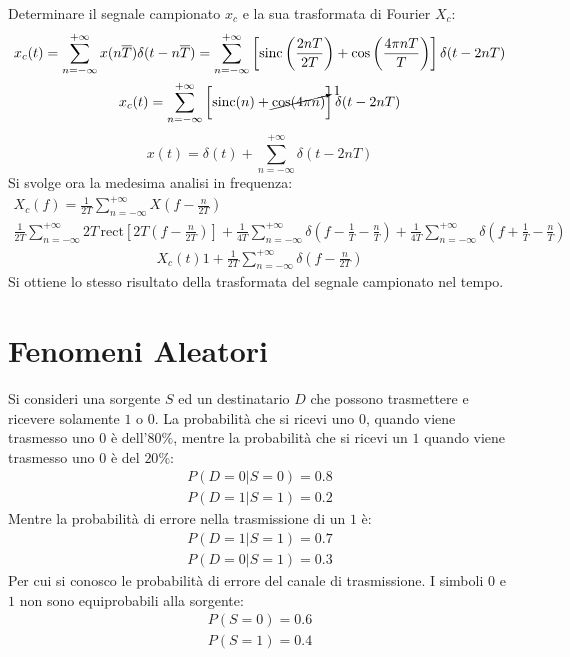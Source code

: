 \documentclass{article}
\newcommand{\rect}{\mathrm{rect}}
\newcommand{\sinc}{\mathrm{sinc}}
\begin{document}
Determinare il segnale campionato $x_c$ e la sua trasformata di Fourier $X_c$:
\begin{gather*}
    x_c(t)=\displaystyle\sum_{n=-\infty}^{+\infty}x(n\overline{T})\delta(t-n\overline{T})=\sum_{n=-\infty}^{+\infty}\left[\sinc\left(\frac{2nT}{2T}\right)+\cos\left(\frac{4\pi nT}{T}\right)\right]\delta(t-2nT)\\
    x_c(t)=\displaystyle\sum_{n=-\infty}^{+\infty}\left[\sinc(n)+\cancelto{1}{\cos(4\pi n)}\right]\delta(t-2nT)
\end{gather*}
\begin{equation}
    x(t)=\displaystyle\delta(t)+\sum_{n=-\infty}^{+\infty}\delta(t-2nT)
\end{equation}
Si svolge ora la medesima analisi in frequenza:
\begin{gather*}
    X_c(f)=\displaystyle\frac{1}{2T}\sum_{n=-\infty}^{+\infty}X\left(f-\frac{n}{2T}\right)\\
    \displaystyle\frac{1}{2T}\sum_{n=-\infty}^{+\infty}2T\,\rect\left[2T\left(f-\frac{n}{2T}\right)\right]+\frac{1}{4T}\sum_{n=-\infty}^{+\infty}\delta\left(f-\frac{1}{T}-\frac{n}{T}\right)+\frac{1}{4T}\sum_{n=-\infty}^{+\infty}\delta\left(f+\frac{1}{T}-\frac{n}{T}\right)
\end{gather*}
\begin{gather}
    X_c(t)1+\displaystyle\frac{1}{2T}\sum_{n=-\infty}^{+\infty}\delta\left(f-\frac{n}{2T}\right)
\end{gather}
Si ottiene lo stesso risultato della trasformata del segnale campionato nel tempo. 

\clearpage

\section{Fenomeni Aleatori}

Si consideri una sorgente $S$ ed un destinatario $D$ che possono trasmettere e ricevere solamente $1$ o $0$. La probabilità che si ricevi uno $0$, 
quando viene trasmesso uno $0$ è dell'$80\%$, mentre la probabilità che si ricevi un $1$ quando viene trasmesso uno $0$ è del $20\%$:
\begin{gather*}
    P(D=0|S=0)=0.8\\
    P(D=1|S=1)=0.2
\end{gather*}
Mentre la probabilità di errore nella trasmissione di un $1$ è:
\begin{gather*}
    P(D=1|S=1)=0.7\\
    P(D=0|S=1)=0.3
\end{gather*}
Per cui si conosco le probabilità di errore del canale di trasmissione.
I simboli $0$ e $1$ non sono equiprobabili alla sorgente:
\begin{gather*}
    P(S=0)=0.6\\
    P(S=1)=0.4
\end{gather*}
\end{document}
